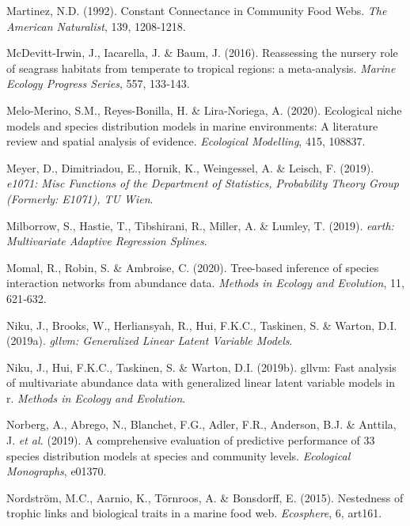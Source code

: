 \documentclass[12pt,]{article}
\newlength{\cslhangindent}
\newenvironment{cslreferences}%
  {\setlength{\parindent}{0pt}%
  \everypar{\setlength{\hangindent}{\cslhangindent}}\ignorespaces}%
  {\par}
\begin{document}
\begin{cslreferences}
\leavevmode\hypertarget{ref-Martinez_1992}{}%
Martinez, N.D. (1992). Constant Connectance in Community Food Webs.
\emph{The American Naturalist}, 139, 1208‑1218.

\leavevmode\hypertarget{ref-McDevitt_Irwin_2016}{}%
McDevitt-Irwin, J., Iacarella, J. \& Baum, J. (2016). Reassessing the
nursery role of seagrass habitats from temperate to tropical regions: a
meta-analysis. \emph{Marine Ecology Progress Series}, 557, 133‑143.

\leavevmode\hypertarget{ref-Melo_Merino_2020}{}%
Melo-Merino, S.M., Reyes-Bonilla, H. \& Lira-Noriega, A. (2020).
Ecological niche models and species distribution models in marine
environments: A literature review and spatial analysis of evidence.
\emph{Ecological Modelling}, 415, 108837.

\leavevmode\hypertarget{ref-Meyer_2019}{}%
Meyer, D., Dimitriadou, E., Hornik, K., Weingessel, A. \& Leisch, F.
(2019). \emph{e1071: Misc Functions of the Department of Statistics,
Probability Theory Group (Formerly: E1071), TU Wien}.

\leavevmode\hypertarget{ref-Milborrow_2017}{}%
Milborrow, S., Hastie, T., Tibshirani, R., Miller, A. \& Lumley, T.
(2019). \emph{earth: Multivariate Adaptive Regression Splines}.

\leavevmode\hypertarget{ref-Momal_2020}{}%
Momal, R., Robin, S. \& Ambroise, C. (2020). Tree-based inference of
species interaction networks from abundance data. \emph{Methods in
Ecology and Evolution}, 11, 621‑632.

\leavevmode\hypertarget{ref-Gllvm_2019}{}%
Niku, J., Brooks, W., Herliansyah, R., Hui, F.K.C., Taskinen, S. \&
Warton, D.I. (2019a). \emph{gllvm: Generalized Linear Latent Variable
Models}.

\leavevmode\hypertarget{ref-Niku_2019}{}%
Niku, J., Hui, F.K.C., Taskinen, S. \& Warton, D.I. (2019b). gllvm: Fast
analysis of multivariate abundance data with generalized linear latent
variable models in r. \emph{Methods in Ecology and Evolution}.

\leavevmode\hypertarget{ref-Norberg_2020}{}%
Norberg, A., Abrego, N., Blanchet, F.G., Adler, F.R., Anderson, B.J. \&
Anttila, J. \emph{et al.} (2019). A comprehensive evaluation of
predictive performance of 33 species distribution models at species and
community levels. \emph{Ecological Monographs}, e01370.

\leavevmode\hypertarget{ref-Nordstrom_2015}{}%
Nordström, M.C., Aarnio, K., Törnroos, A. \& Bonsdorff, E. (2015).
Nestedness of trophic links and biological traits in a marine food web.
\emph{Ecosphere}, 6, art161.


\end{cslreferences}
\end{document}
